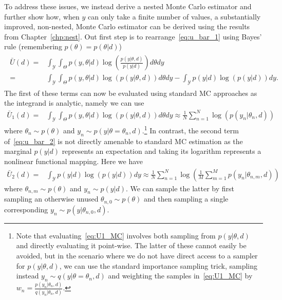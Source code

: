 To address these issues, we instead derive a nested Monte Carlo estimator and further
show how, when $y$ can only take a finite number of values,
a substantially improved, non-nested, Monte Carlo estimator can be derived using the
results from Chapter~\ref{chp:nest}.
Out first step is to rearrange~\eqref{eq:u_bar_1} using Bayes' rule (remembering
$p(\theta)=p(\theta|d)$)
\begin{align}
\label{eq:u_bar_2}
\begin{split}
\bar{U}(d)
=& \int_{\mathcal{Y}}\int_{\Theta} p(y,\theta | d) \log\left(\frac{p(y | \theta, d)}{p(y |d)}\right) d\theta dy \\
=&\int_{\mathcal{Y}}\int_{\Theta} p(y,\theta | d) \log(p(y | \theta, d)) d\theta dy - \int_{\mathcal{Y}} p(y | d) \log(p(y | d))dy.
\end{split}
\end{align}
The first of these terms can now be evaluated using standard MC approaches as the integrand is analytic,
namely we can use
\begin{align}
\bar{U}_1(d) = &\int_{\mathcal{Y}}\int_{\Theta} p(y,\theta | d) \log(p(y | \theta, d)) d\theta dy
\approx \frac{1}{N} \sum_{n=1}^{N} \log(p(y_n | \theta_n, d)) \label{eq:U1_MC}
\end{align}
where $\theta_n \sim p(\theta)$ and $y_n \sim p(y|\theta=\theta_n, d)$.\footnote{Note 
	that evaluating~\eqref{eq:U1_MC} involves both
sampling from $p(y | \theta, d)$ and directly evaluating it point-wise.
The latter of these cannot easily be avoided, but in the scenario where we
do not have direct access to a sampler for $p(y | \theta, d)$, we can
use the standard importance sampling trick, sampling instead
$y_n \sim q(y|\theta=\theta_n, d)$ and weighting the samples in~\eqref{eq:U1_MC}
by $w_n = \frac{p(y_n|\theta_n, d)}{q(y_n|\theta_n, d)}$.}
In contrast, the second term of~\eqref{eq:u_bar_2} is not directly amenable to standard MC estimation
as the marginal $p(y|d)$ represents an expectation
and taking its logarithm represents a nonlinear functional mapping.  
Here we have
\begin{align}
\bar{U}_2(d) = &\int_{\mathcal{Y}} p(y | d) \log(p(y | d))dy
\approx \frac{1}{N} \sum_{n=1}^{N} \log \left(\frac{1}{M} \sum_{m=1}^{M} p(y_n | \theta_{n,m}, d)\right) \label{eq:U2_MC}
\end{align}
where $\theta_{n,m} \sim p(\theta)$ and $y_n \sim p(y | d)$.  We can sample the latter by first sampling an otherwise unused $\theta_{n,0} \sim p(\theta)$ and 
then sampling a single corresponding $y_n \sim p(y | \theta_{n,0}, d)$.

